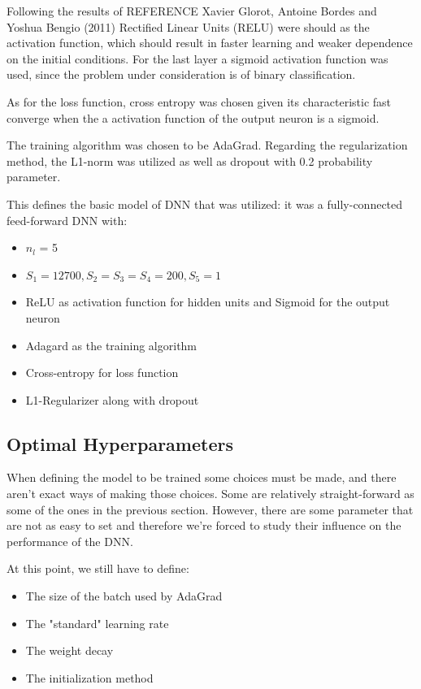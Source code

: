 \documentclass{article}
\begin{document}
Following the results of REFERENCE  Xavier Glorot, Antoine Bordes and Yoshua Bengio (2011) Rectified Linear Units (RELU) were should as the activation function, which should result in faster learning and weaker dependence on the initial conditions. For the last layer a sigmoid activation function was used, since the problem under consideration is of binary classification.

As for the loss function, cross entropy was chosen given its characteristic fast converge when the a activation function of the output neuron is a sigmoid.

The training algorithm was chosen to be AdaGrad.
Regarding the regularization method, the L1-norm was utilized as well as dropout with 0.2 probability parameter.

This defines the basic model of DNN that was utilized: it was a fully-connected feed-forward DNN with:
\begin{itemize}
\item $n_l$ = 5
\item $S_1 = 12700, S_2=S_3=S_4 = 200, S_5=1$
\item ReLU as activation function for hidden units and Sigmoid for the output neuron
\item Adagard as the training algorithm
\item Cross-entropy for loss function
\item L1-Regularizer along with dropout
\end{itemize}

\subsection{Optimal Hyperparameters}
\label{subsec:hyperparameters}

When defining the model to be trained some choices must be made, and there aren't exact ways of making those choices. Some are relatively straight-forward as some of the ones in the previous section. However, there are some parameter that are not as easy to set and therefore we're forced to study their influence on the performance of the DNN.

At this point, we still have to define:
\begin{itemize}
\item The size of the batch used by AdaGrad
\item The "standard" learning rate
\item The weight decay
\item The initialization method
\end{itemize}
\end{document}
